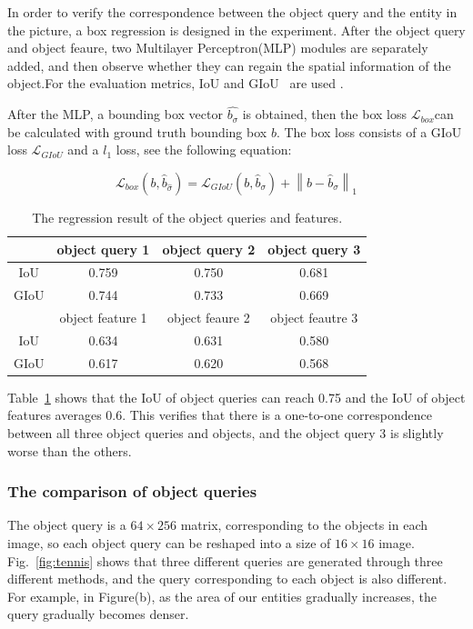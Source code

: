 In order to verify the correspondence between the object query and the entity in the picture, a box regression is designed in the experiment. After the object query and object feaure, two Multilayer Perceptron(MLP) modules are separately added, and then observe whether they can regain the spatial information of the object.For the evaluation metrics, IoU and GIoU~\cite{rezatofighi2019generalized} are used .

After the MLP, a bounding box vector $ \hat{b_\sigma} $ is obtained, then the box loss $\mathcal{L}_{box}$can be calculated with ground truth bounding box $b$. The box loss consists of a GIoU loss $  \mathcal{L}_{GIoU} $ and a $l_1$ loss, see the following equation:

$$ \mathcal{L}_{box}(b,\hat{b}_{\hat{\sigma}}) = \mathcal{L}_{GIoU}(b,\hat{b}_{\sigma}) + \left \| b - \hat{b}_{\sigma}  \right \| _1 $$

\begin{table}[!h]
	\centering
	\begin{tabular}{c|ccc}
		\bottomrule
		& object query 1 & object query 2 & object query 3  \\ \midrule
		IoU  & 0.759  & 0.750  & 0.681    \\
		GIoU & 0.744  & 0.733 & 0.669   \\ \midrule
		&object feature 1  &object feaure 2 & object feautre 3\\ \midrule
		IoU & 0.634 & 0.631 & 0.580 \\
		GIoU	& 0.617 & 0.620 & 0.568  \\\bottomrule
		
	\end{tabular}
\caption[The regression result of the object query and feature]{The regression result of the object queries and features.}
\label{tab:regresstion}
\end{table}

Table~\ref{tab:regresstion} shows that the IoU of object queries can reach 0.75 and the IoU of object features averages 0.6. This verifies that there is a one-to-one correspondence between all three object queries and objects, and the object query 3 is slightly worse than the others.

\subsubsection{The comparison of object queries}
The object query is a $ 64 \times 256 $ matrix, corresponding to the objects in each image, so  each object query can be reshaped into a size of $16 \times 16$ image. Fig.~\ref{fig:tennis}  shows that three different queries are generated through three different methods, and the query corresponding to each object is also different. For example, in Figure(b), as the area of our entities gradually increases, the query gradually becomes denser. 



